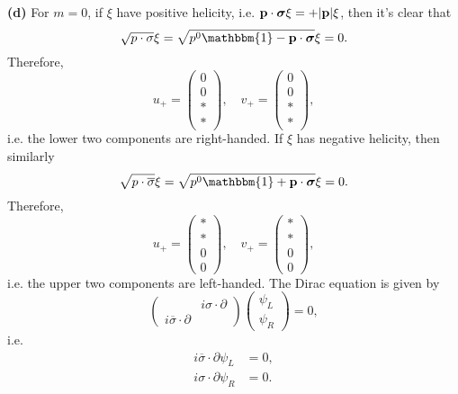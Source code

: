 \documentclass{article}
\makeatletter
\newcommand*{\shifttext}[1]{%
  \settowidth{\@tempdima}{#1}%
  \hspace{-\@tempdima}#1%
}
\newcommand{\plabel}[1]{%
\shifttext{\textbf{#1}\quad}%
}
\makeatother
\begin{document}
\plabel{(d)}%
For $m=0$, if $\xi$ have positive helicity, i.e. $\vb{p}\cdot \vb*{\sigma} \xi = +\abs{\vb{p}} \xi$, then it's clear that
\[ \sqrt{p\cdot \sigma} \xi = \sqrt{p^0 \mathbbm{1} - \vb{p}\cdot \vb*{\sigma}}\xi = 0. \]
Therefore,
\[ u_+ = \begin{pmatrix}
    0 \\ 0 \\ * \\ *
\end{pmatrix},\quad v_+ = \begin{pmatrix}
    0 \\ 0 \\ * \\ *
\end{pmatrix}, \]
i.e. the lower two components are right-handed.
If $\xi$ has negative helicity, then similarly
\[ \sqrt{p\cdot \overline{\sigma}} \xi = \sqrt{p^0 \mathbbm{1} + \vb{p}\cdot \vb*{\sigma}}\xi = 0. \]
Therefore,
\[ u_+ = \begin{pmatrix}
    * \\ * \\ 0 \\ 0
\end{pmatrix},\quad v_+ = \begin{pmatrix}
    * \\ * \\ 0 \\ 0
\end{pmatrix}, \]
i.e. the upper two components are left-handed.
The Dirac equation is given by
\[ \begin{pmatrix}
    & i\sigma \cdot \partial \\
    i\overline{\sigma}\cdot \partial &
\end{pmatrix} \begin{pmatrix}
    \psi_L \\ \psi_R
\end{pmatrix} = 0, \]
i.e.
\begin{align*}
    i\overline{\sigma}\cdot \partial \psi_L &= 0, \\
    i\sigma\cdot \partial \psi_R &= 0.
\end{align*}
\end{document}
